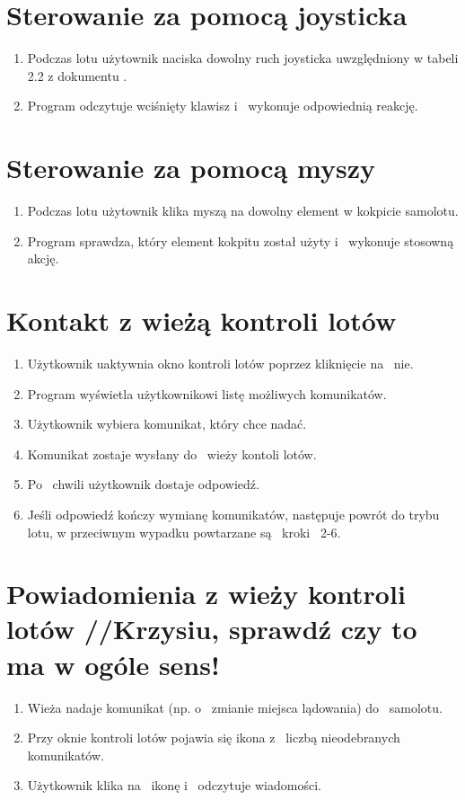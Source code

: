 \documentclass{mwrep}
\begin{document}
\section{Sterowanie za pomocą joysticka}
\begin{enumerate}
  \item Podczas lotu użytownik naciska dowolny ruch joysticka uwzględniony w tabeli 2.2 z dokumentu \cite{WYM}.
  \item Program odczytuje wciśnięty klawisz i~ wykonuje odpowiednią reakcję.
\end{enumerate}

\section{Sterowanie za pomocą myszy}
\begin{enumerate}
  \item Podczas lotu użytownik klika myszą na dowolny element w kokpicie samolotu.
  \item Program sprawdza, który element kokpitu został użyty i~ wykonuje stosowną akcję.
\end{enumerate}

\section{Kontakt z wieżą kontroli lotów}
\begin{enumerate}
  \item Użytkownik uaktywnia okno kontroli lotów poprzez kliknięcie na~ nie.
  \item Program wyświetla użytkownikowi listę możliwych komunikatów.
  \item Użytkownik wybiera komunikat, który chce nadać.
  \item Komunikat zostaje wysłany do~ wieży kontoli lotów.
  \item Po~ chwili użytkownik dostaje odpowiedź.
  \item Jeśli odpowiedź kończy wymianę komunikatów, następuje powrót do trybu lotu, w przeciwnym wypadku powtarzane są~ kroki~ 2-6.
\end{enumerate}

\section{Powiadomienia z wieży kontroli lotów //Krzysiu, sprawdź czy to ma w ogóle sens!}
\begin{enumerate}
  \item Wieża nadaje komunikat (np. o~ zmianie miejsca lądowania) do~ samolotu.
  \item Przy oknie kontroli lotów pojawia się ikona z~ liczbą nieodebranych komunikatów.
  \item Użytkownik klika na~ ikonę i~ odczytuje wiadomości.
\end{enumerate}
\end{document}
